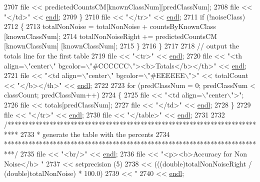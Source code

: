 \begin{DoxyCode}
{2707       file << predictedCountsCM[knownClassNum][predClassNum]; 
2708       file << \textcolor{stringliteral}{"</td>"} << \hyperlink{namespace_k_k_b_ad1f50f65af6adc8fa9e6f62d007818a8}{endl};
2709     \}
2710     file << \textcolor{stringliteral}{"</tr>"} << \hyperlink{namespace_k_k_b_ad1f50f65af6adc8fa9e6f62d007818a8}{endl};
2711     \textcolor{keywordflow}{if}  (!noiseClass)
2712     \{
2713       totalNonNoise = totalNonNoise + countsByKnownClass [knownClassNum];
2714       totalNonNoiseRight += predictedCountsCM [knownClassNum] [knownClassNum];
2715     \}
2716   \}
2717 
2718   \textcolor{comment}{// output the totals line for the first table}
2719   file << \textcolor{stringliteral}{"<tr>"} << \hyperlink{namespace_k_k_b_ad1f50f65af6adc8fa9e6f62d007818a8}{endl};
2720   file << \textcolor{stringliteral}{"<th align=\(\backslash\)"center\(\backslash\)" bgcolor=\(\backslash\)"#CCCCCC\(\backslash\)"><b>Totals</b></th>"} << \hyperlink{namespace_k_k_b_ad1f50f65af6adc8fa9e6f62d007818a8}{endl};
2721   file << \textcolor{stringliteral}{"<td align=\(\backslash\)"center\(\backslash\)" bgcolor=\(\backslash\)"#EEEEEE\(\backslash\)">"} << totalCount << \textcolor{stringliteral}{"</b></th>"} << 
      \hyperlink{namespace_k_k_b_ad1f50f65af6adc8fa9e6f62d007818a8}{endl};
2722   
2723   \textcolor{keywordflow}{for}  (predClassNum = 0; predClassNum < classCount; predClassNum++)
2724   \{
2725     file << \textcolor{stringliteral}{"<td align=\(\backslash\)"center\(\backslash\)">"};
2726     file << totals[predClassNum]; 
2727     file << \textcolor{stringliteral}{"</td>"} << \hyperlink{namespace_k_k_b_ad1f50f65af6adc8fa9e6f62d007818a8}{endl};
2728   \}
2729   file << \textcolor{stringliteral}{"</tr>"} << \hyperlink{namespace_k_k_b_ad1f50f65af6adc8fa9e6f62d007818a8}{endl};
2730   file << \textcolor{stringliteral}{"</table>"} << \hyperlink{namespace_k_k_b_ad1f50f65af6adc8fa9e6f62d007818a8}{endl};
2731 
2732   \textcolor{comment}{/***************************************************************************}
2733 \textcolor{comment}{   * generate the table with the percents}
2734 \textcolor{comment}{   ***************************************************************************/}
2735   file  << \textcolor{stringliteral}{"<br/>"} << \hyperlink{namespace_k_k_b_ad1f50f65af6adc8fa9e6f62d007818a8}{endl};
2736   file  << \textcolor{stringliteral}{"<p><b>Accuracy for Non Noise</b> "}
2737           << setprecision (5)
2738           << (((double)totalNonNoiseRight / (\textcolor{keywordtype}{double})totalNonNoise) * 100.0)
2739           << \textcolor{stringliteral}{"%
2740           << \hyperlink{namespace_k_k_b_ad1f50f65af6adc8fa9e6f62d007818a8}{endl};
}}
\end{DoxyCode}

